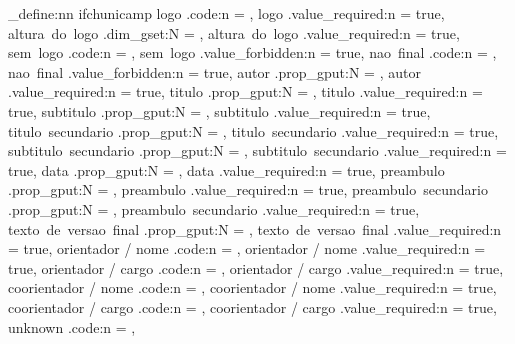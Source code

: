 \keys_define:nn { ifchunicamp }{
  logo .code:n = {
      { \gdef\ifch@logo@file{#1} }
      {  }
  },
  logo .value_required:n = true,
  altura~do~logo .dim_gset:N = \ifch@altura@logo,
  altura~do~logo .value_required:n = true,
  sem~logo .code:n = { \global\let\ifch@put@logo=\relax },
  sem~logo .value_forbidden:n = true,
  nao~final .code:n = { \global\let\ifch@put@vfinal=\phantom },
  nao~final .value_forbidden:n = true,
  autor .prop_gput:N = \ifch@keys,
  autor .value_required:n = true,
  titulo .prop_gput:N = \ifch@keys,
  titulo .value_required:n = true,
  subtitulo .prop_gput:N = \ifch@keys,
  subtitulo .value_required:n = true,
  titulo~secundario .prop_gput:N = \ifch@keys,
  titulo~secundario .value_required:n = true,
  subtitulo~secundario .prop_gput:N = \ifch@keys,
  subtitulo~secundario .value_required:n = true,
  data .prop_gput:N = \ifch@keys,
  data .value_required:n = true,
  preambulo .prop_gput:N = \ifch@keys,
  preambulo .value_required:n = true,
  preambulo~secundario .prop_gput:N = \ifch@keys,
  preambulo~secundario .value_required:n = true,
  texto~de~versao~final .prop_gput:N = \ifch@keys,
  texto~de~versao~final .value_required:n = true,
  orientador / nome .code:n = \ifch@slashed@kv,
  orientador / nome .value_required:n = true,
  orientador / cargo .code:n = \ifch@slashed@kv,
  orientador / cargo .value_required:n = true,
  coorientador / nome .code:n = \ifch@slashed@kv,
  coorientador / nome .value_required:n = true,
  coorientador / cargo .code:n = \ifch@slashed@kv,
  coorientador / cargo .value_required:n = true,
  unknown .code:n = {
    \@expandtwoargs\in@{\CurrentOption}{\ifch@bookoptions}
    \ifin@
    \else
    \fi
  },
}  %


\ExplSyntaxOff
\ProcessKeyOptions[ifchunicamp]\relax

